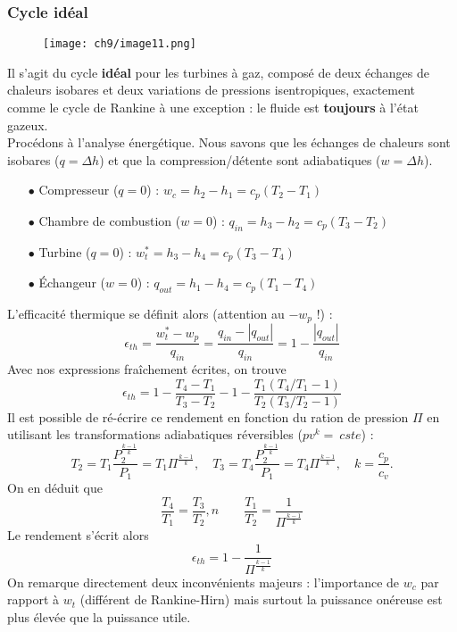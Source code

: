 		\subsubsection{Cycle idéal}
		\begin{wrapfigure}[11]{l}{10cm}
		\vspace{-5mm}
	\texttt{[image: ch9/image11.png]}
		\end{wrapfigure}			
	Il s'agit du cycle \textbf{idéal} pour les turbines à gaz, composé de deux échanges 
	de chaleurs isobares et deux variations de pressions isentropiques, exactement comme 
	le cycle de Rankine à une exception : le fluide est \textbf{toujours} à l'état 
	gazeux.\\
	
	Procédons à l'analyse énergétique. Nous savons que les échanges de chaleurs sont 
	isobares ($q = \Delta h$) et que la compression/détente sont adiabatiques ($w=\Delta h$).
	
	\begin{itemize}
	\item[$\bullet$] Compresseur ($q=0$) : $w_c = h_2-h_1 = c_p(T_2-T_1)$
	\item[$\bullet$] Chambre de combustion ($w=0$) : $q_{in} = h_3-h_2 = c_p(T_3-T_2)$
	\item[$\bullet$] Turbine ($q=0$) : $w^*_t = h_3-h_4 = c_p(T_3-T_4)$
	\item[$\bullet$] Échangeur ($w=0$) : $q_{out} = h_1-h_4 = c_p(T_1-T_4)$
	\end{itemize}
	L'efficacité thermique se définit alors (attention au $-w_p$ !) :
	\begin{equation}
	\epsilon_{th} = \dfrac{w_t^*-w_p}{q_{in}} = \dfrac{q_{in}-|q_{out}|}{q_{in}} = 1-
	\dfrac{|q_{out}|}{q_{in}}
	\end{equation}
	Avec nos expressions fraîchement écrites, on trouve
	\begin{equation}
	\epsilon_{th} = 1-\dfrac{T_4-T_1}{T_3-T_2} - 1-\dfrac{T_1(T_4/T_1-1)}{T_2(T_3/T_2-1)}
	\end{equation}
	Il est possible de ré-écrire ce rendement en fonction du ration de pression $\Pi$ en 
	utilisant les transformations adiabatiques réversibles ($pv^k =\ cste$) :
	\begin{equation}
	T_2 = T_1 \dfrac{P_2^{\frac{k-1}{k}}}{P_1} = T_1\Pi^{\frac{k-1}{k}}, \quad 
	T_3 = T_4 \dfrac{P_2^{\frac{k-1}{k}}}{P_1} = T_4\Pi^{\frac{k-1}{k}}, \quad k = \dfrac{c_p}{
	c_v}.
	\end{equation}
	On en déduit que
	\begin{equation}
	\dfrac{T_4}{T_1}=\dfrac{T_3}{T_2},n \qquad \dfrac{T_1}{T_2} = \dfrac{1}{\Pi^{\frac{k-1}{k}}}
	\end{equation}
	Le rendement s'écrit alors 
	\begin{equation}
	\epsilon_{th} = 1- \dfrac{1}{\Pi^{\frac{k-1}{k}}}
	\end{equation}
	On remarque directement deux inconvénients majeurs : l'importance de $w_c$ par rapport 
	à $w_t$ (différent de Rankine-Hirn) mais surtout la puissance onéreuse est plus élevée 
	que la puissance utile.
	
